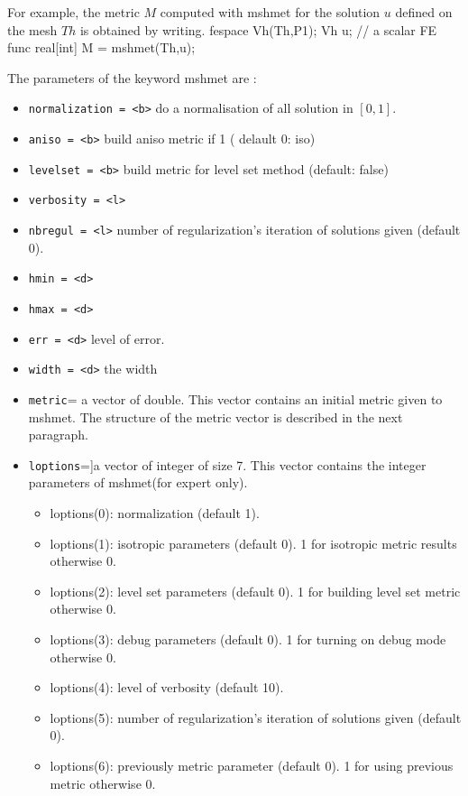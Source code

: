 \documentclass[a4paper,twoside,12pt]{book}
\begin{document}
For example, the metric $M$ computed with mshmet  for the solution $u$ defined on the mesh $Th$ is obtained by writing.
\bFF
fespace Vh(Th,P1);
Vh u; // a scalar FE func
real[int] M = mshmet(Th,u);
\eFF

The parameters of the keyword mshmet are :
\begin{itemize}\parskip=0cm
\item	\texttt{normalization =  <b>} do a normalisation of all solution in $[0,1]$.
\item	\texttt{aniso =  <b>} build aniso metric if 1 ( delault 0: iso) 
\item	\texttt{levelset =  <b>} {build metric for level set method (default: false)}
\item	\texttt{verbosity =  <l>}
\item	\texttt{nbregul =  <l>} number of regularization's iteration of solutions given (default 0).
\item	\texttt{hmin =  <d>}
\item	\texttt{hmax =  <d>}
\item	\texttt{err =  <d>} level of error. 
\item	\texttt{width =  <d>} the width 
\item \texttt{metric}= a vector of double. This vector contains an initial metric given to mshmet. The structure of the metric vector is described in the next paragraph.

\item \texttt{loptions}=]a vector of integer of size 7. This vector contains the integer parameters of mshmet(for expert only).
\begin{itemize} \item loptions(0): normalization (default 1).
\item loptions(1): isotropic parameters (default 0). 1 for isotropic metric results otherwise 0.
\item loptions(2): level set parameters (default 0). 1 for building level set metric otherwise 0.
\item loptions(3): debug parameters (default 0). 1 for turning on debug mode otherwise 0.
\item loptions(4): level of verbosity (default 10).
\item loptions(5): number of regularization's iteration of solutions given (default 0). 
\item loptions(6): previously metric parameter (default 0). 1 for using previous metric otherwise 0.
\end{itemize}


\end{itemize}
\end{document}
